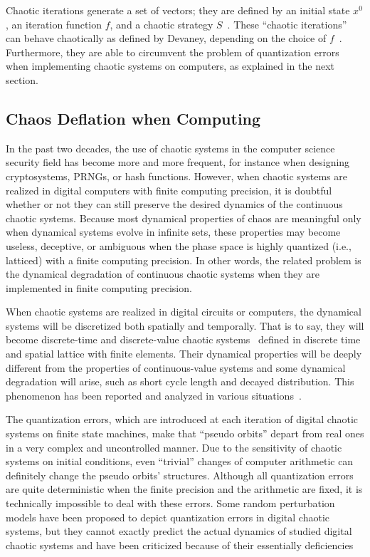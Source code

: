 Chaotic iterations generate a set of vectors;
they are defined by an initial state $x^{0}$, an iteration function $f$, and a chaotic strategy $S$~\cite{GuyeuxThese10,bibtexwangqianxue}.
These ``chaotic iterations'' can behave chaotically as defined by Devaney, 
depending on the choice of $f$~\cite{GuyeuxThese10}.
Furthermore, they are able to circumvent the problem of quantization
errors when implementing chaotic systems on computers, as explained
in the next section.


\subsection{Chaos Deflation when Computing}

In the past two decades, the use of chaotic systems in the 
computer science security field has become more and more frequent,
for instance when designing cryptosystems, PRNGs, or hash functions.
However, when chaotic systems are realized in digital computers with finite computing precision, it is doubtful whether or not they can still preserve the desired dynamics of the continuous chaotic systems. Because most dynamical properties of chaos are meaningful only when dynamical systems evolve in infinite sets, these properties may become useless, deceptive, or ambiguous when the phase space is highly quantized (i.e., latticed) with a finite computing precision. In other words, 
the related problem is the dynamical degradation of continuous chaotic systems 
when they are implemented in finite computing precision. 


When chaotic systems are realized in digital circuits or computers, the dynamical systems
will be discretized both spatially and temporally.
That is to say, they will become
discrete-time and discrete-value chaotic systems~\cite{MazrooeiSebdani2008628} defined in discrete time and spatial
lattice with finite elements. Their dynamical properties will be deeply different from the properties of continuous-value systems and some dynamical degradation will arise, such as short cycle length and decayed distribution. This phenomenon has been reported and analyzed in various situations~\cite{Binder1986,Wheeler1989,Palmore1990,Blank1997,Li2005}.



The quantization errors, which are introduced 
at each iteration of digital chaotic systems on finite
state machines, 
make that ``pseudo orbits'' depart from real ones in
a very complex and uncontrolled manner. Due to the sensitivity of chaotic systems on initial conditions, even ``trivial'' changes of computer arithmetic can definitely change the pseudo orbits' structures.
Although all quantization errors are quite deterministic 
when the finite precision and the arithmetic are fixed, 
it is technically impossible to deal with these
errors. Some random perturbation models have been proposed to depict quantization errors in digital chaotic systems, but they cannot exactly predict the actual dynamics of studied digital chaotic systems and have been criticized because of their essentially deficiencies


